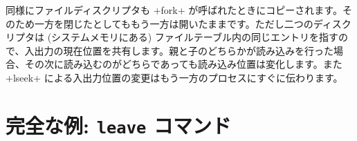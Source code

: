 同様にファイルディスクリプタも \ml+fork+ が呼ばれたときにコピーされます。そのため一方を閉じたとしてももう一方は開いたままです。ただし二つのディスクリプタは (システムメモリにある) ファイルテーブル内の同じエントリを指すので、入出力の現在位置を共有します。親と子のどちらかが読み込みを行った場合、その次に読み込むのがどちらであっても読み込み位置は変化します。また \ml+lseek+ による入出力位置の変更はもう一方のプロセスにすぐに伝わります。


\section{完全な例: {\normalfont\texttt{leave}} コマンド}

